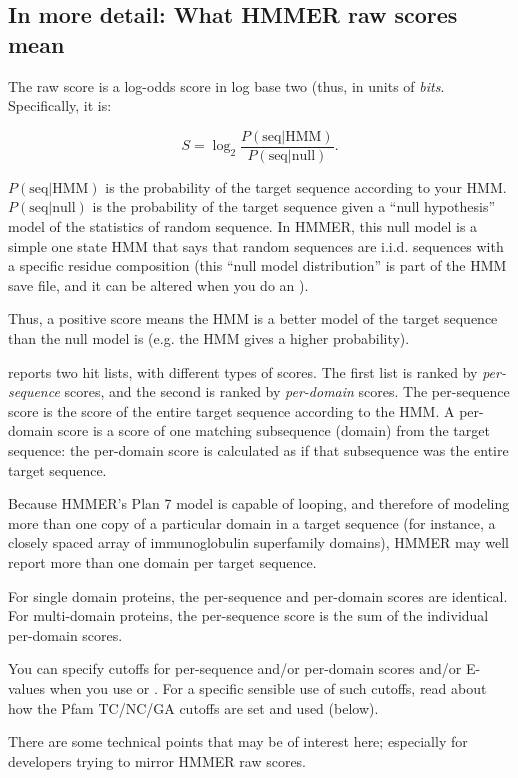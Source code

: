 \subsection{In more detail: What HMMER raw scores mean}

The raw score is a log-odds score in log base two (thus, in units of
{\em bits}. Specifically, it is:

\[
	S = \log_2 \frac {P( \mbox{seq} | \mbox{HMM})} { P (\mbox{seq} |
	\mbox{null})}.
\]

$P( \mbox{seq} | \mbox{HMM})$ is the probability of the target sequence
according to your HMM. $ P (\mbox{seq} | \mbox{null}) $ is the
probability of the target sequence given a ``null hypothesis'' model
of the statistics of random sequence. In HMMER, this null model is a
simple one state HMM that says that random sequences are i.i.d.
sequences with a specific residue composition (this ``null model
distribution'' is part of the HMM save file, and it can be altered
when you do an ).

Thus, a positive score means the HMM is a better model of the target
sequence than the null model is (e.g. the HMM gives a higher
probability).

 reports two hit lists, with different types of
scores. The first list is ranked by {\em per-sequence} scores, and the
second is ranked by {\em per-domain} scores. The per-sequence score is
the score of the entire target sequence according to the HMM. A
per-domain score is a score of one matching subsequence (domain) from
the target sequence: the per-domain score is calculated as if that
subsequence was the entire target sequence. 

Because HMMER's Plan 7 model is capable of looping, and therefore of
modeling more than one copy of a particular domain in a target
sequence (for instance, a closely spaced array of immunoglobulin
superfamily domains), HMMER may well report more than one domain per
target sequence.

For single domain proteins, the per-sequence and per-domain scores are
identical. For multi-domain proteins, the per-sequence score is the
sum of the individual per-domain scores.

You can specify cutoffs for per-sequence and/or per-domain scores
and/or E-values when you use  or .  For
a specific sensible use of such cutoffs, read about how the Pfam
TC/NC/GA cutoffs are set and used (below).

There are some technical points that may be of interest here;
especially for developers trying to mirror HMMER raw scores.

